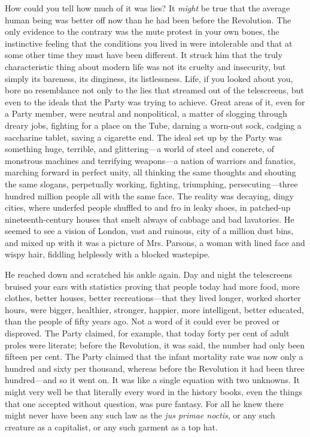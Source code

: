 How could you tell how much of it was lies? It \emph{might} be true that
the average human being was better off now than he had been before the
Revolution. The only evidence to the contrary was the mute protest in
your own bones, the instinctive feeling that the conditions you lived in
were intolerable and that at some other time they must have been
different. It struck him that the truly characteristic thing about
modern life was not its cruelty and insecurity, but simply its bareness,
its dinginess, its listlessness. Life, if you looked about you, bore no
resemblance not only to the lies that streamed out of the telescreens,
but even to the ideals that the Party was trying to achieve. Great areas
of it, even for a Party member, were neutral and nonpolitical, a matter
of slogging through dreary jobs, fighting for a place on the Tube,
darning a worn-out sock, cadging a saccharine tablet, saving a cigarette
end. The ideal set up by the Party was something huge, terrible, and
glittering---a world of steel and concrete, of monstrous machines and
terrifying weapons---a nation of warriors and fanatics, marching forward
in perfect unity, all thinking the same thoughts and shouting the same
slogans, perpetually working, fighting, triumphing, persecuting---three
hundred million people all with the same face. The reality was decaying,
dingy cities, where underfed people shuffled to and fro in leaky shoes,
in patched-up nineteenth-century houses that smelt always of cabbage and
bad lavatories. He seemed to see a vision of London, vast and ruinous,
city of a million dust bins, and mixed up with it was a picture of Mrs.
Parsons, a woman with lined face and wispy hair, fiddling helplessly
with a blocked wastepipe.

He reached down and scratched his ankle again. Day and night the
telescreens bruised your ears with statistics proving that people today
had more food, more clothes, better houses, better recreations---that
they lived longer, worked shorter hours, were bigger, healthier,
stronger, happier, more intelligent, better educated, than the people of
fifty years ago. Not a word of it could ever be proved or disproved. The
Party claimed, for example, that today forty per cent of adult proles
were literate; before the Revolution, it was said, the number had only
been fifteen per cent. The Party claimed that the infant mortality rate
was now only a hundred and sixty per thousand, whereas before the
Revolution it had been three hundred---and so it went on. It was like a
single equation with two unknowns. It might very well be that literally
every word in the history books, even the things that one accepted
without question, was pure fantasy. For all he knew there might never
have been any such law as the \emph{jus primae noctis}, or any such
creature as a capitalist, or any such garment as a top hat.

